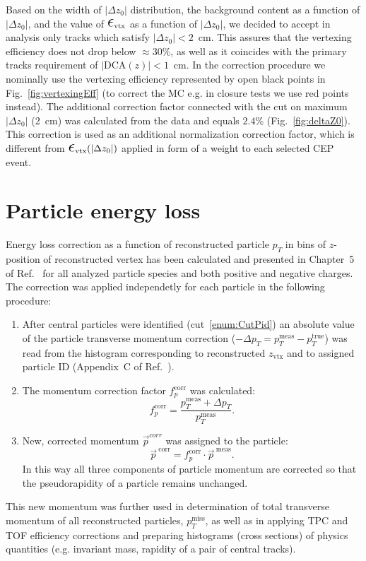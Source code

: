 Based on the width of $|\Delta z_{0}|$ distribution, the background content as a function of $|\Delta z_{0}|$, and the value of $\mbox{\LARGE$\epsilon$}_{\text{vtx}}$ as a function of $|\Delta z_{0}|$, we decided to accept in analysis only tracks which satisfy $|\Delta z_{0}|<2$~cm. This assures that the vertexing efficiency does not drop below $\approx 30\%$, as well as it coincides with the primary tracks requirement of $|\text{DCA}(z)|<1$~cm. In the correction procedure we nominally use the vertexing efficiency represented by open black points in Fig.~\ref{fig:vertexingEff} (to correct the MC e.g. in closure tests we use red points instead). The additional correction factor connected with the cut on maximum $|\Delta z_{0}|$ (2~cm) was calculated from the data and equals $2.4\%$ (Fig.~\ref{fig:deltaZ0}). This correction is used as an additional normalization correction factor, which is different from $\mbox{\LARGE$\epsilon$}_{\text{vtx}}(|\Delta z_{0}|)$ applied in form of a weight to each selected CEP event.


\section{Particle energy loss}\label{sec:energyLoss}

Energy loss correction as a function of reconstructed particle $p_{T}$ in bins of $z$-position of reconstructed vertex has been calculated and presented in Chapter~5 of Ref.~\cite{supplementaryNote} for all analyzed particle species and both positive and negative charges. The correction was applied independetly for each particle in the following procedure:

\begin{enumerate}
	\item After central particles were identified (cut~\ref{enum:CutPid}) an absolute value of the particle transverse momentum correction ($-\Delta p_{T} = p_{T}^{\text{meas}}-p_{T}^{\text{true}}$) was read from the histogram corresponding to reconstructed $z_{\text{vtx}}$ and to assigned particle ID (Appendix~C of Ref.~\cite{supplementaryNote}).
	\item The momentum correction factor $f_{p}^{\text{corr}}$ was calculated:
	\begin{equation}\label{eq:pCorrFactor}
 f_{p}^{\text{corr}} = \frac{p_{T}^{\text{meas}} + \Delta p_{T}}{p_{T}^{\text{meas}}}.
  \end{equation}
  \item New, corrected momentum $\vec{p}^{corr}$ was assigned to the particle:
  \begin{equation}
   \vec{p}^{~\text{corr}} = f_{p}^{\text{corr}} \cdot \vec{p}^{~\text{meas}}.
  \end{equation}
  In this way all three components of particle momentum are corrected so that the pseudorapidity of a particle remains unchanged.
\end{enumerate}
This new momentum was further used in determination of total transverse momentum of all reconstructed particles, $p_{T}^{\text{miss}}$, as well as in applying TPC and TOF efficiency corrections and preparing histograms (cross sections) of physics quantities (e.g. invariant mass, rapidity of a pair of central tracks).


